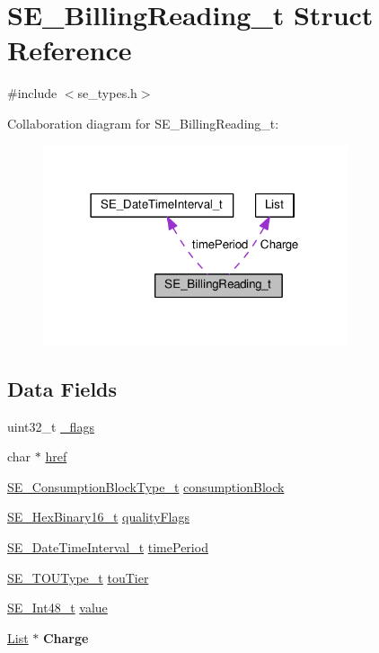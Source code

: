 \hypertarget{structSE__BillingReading__t}{}\section{S\+E\+\_\+\+Billing\+Reading\+\_\+t Struct Reference}
\label{structSE__BillingReading__t}


{\ttfamily \#include $<$se\+\_\+types.\+h$>$}



Collaboration diagram for S\+E\+\_\+\+Billing\+Reading\+\_\+t\+:\nopagebreak
\begin{figure}[H]
\begin{center}
\leavevmode
\includegraphics[width=254pt]{structSE__BillingReading__t__coll__graph}
\end{center}
\end{figure}
\subsection*{Data Fields}
\begin{DoxyCompactItemize}
\item 
uint32\+\_\+t \hyperlink{group__BillingReading_ga347586ffe6481f13ef2a86ae5c2802f1}{\+\_\+flags}
\item 
char $\ast$ \hyperlink{group__BillingReading_gaefb40f15330576c4cf4dcdbf218648a1}{href}
\item 
\hyperlink{group__ConsumptionBlockType_ga526f797922e4c3009d50c28f457c462e}{S\+E\+\_\+\+Consumption\+Block\+Type\+\_\+t} \hyperlink{group__BillingReading_gafcecb5b014f7cd87df8944a0c04c4205}{consumption\+Block}
\item 
\hyperlink{group__HexBinary16_gac040be0e918a360be6bcf5e8b8ad2c49}{S\+E\+\_\+\+Hex\+Binary16\+\_\+t} \hyperlink{group__BillingReading_ga2d2f8b1f807f992cd505186820b6cea2}{quality\+Flags}
\item 
\hyperlink{structSE__DateTimeInterval__t}{S\+E\+\_\+\+Date\+Time\+Interval\+\_\+t} \hyperlink{group__BillingReading_gaf005e1ec874e2c47b377b1920e8dabba}{time\+Period}
\item 
\hyperlink{group__TOUType_gadcfd871f87df34ae8228b9484ebedc6a}{S\+E\+\_\+\+T\+O\+U\+Type\+\_\+t} \hyperlink{group__BillingReading_gad7e3baa3bf7a76797bb28792a2a02dd8}{tou\+Tier}
\item 
\hyperlink{group__Int48_ga87620025dc9f6c732fa48fcab95861ce}{S\+E\+\_\+\+Int48\+\_\+t} \hyperlink{group__BillingReading_gabd07007bfa337e4ff2dddde3c86b93ce}{value}
\item 
\hyperlink{structList}{List} $\ast$ {\bfseries Charge}
\end{DoxyCompactItemize}


